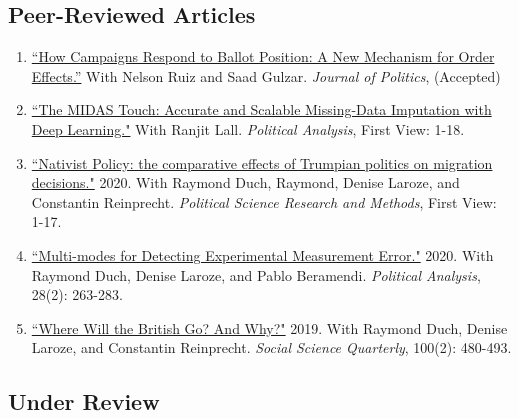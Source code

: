 \documentclass[11pt, a4paper]{article}
\begin{document}
 \subsection*{Peer-Reviewed Articles}

 \begin{enumerate}

 \item \href{https://ts-robinson.com/publication/gulzar-how-campaigns-respond-2020/gulzar-how-campaigns-respond-2020.pdf}{``How Campaigns Respond to Ballot Position: A New Mechanism for Order Effects.''} With Nelson Ruiz and Saad Gulzar. \textit{Journal of Politics}, (Accepted)

 \item \href{https://doi.org/10.1017/pan.2020.49}{``The MIDAS Touch: Accurate and Scalable Missing-Data Imputation with Deep Learning."} With Ranjit Lall. \textit{Political Analysis}, First View: 1-18.

 \item \href{https://doi.org/10.1017/psrm.2020.33}{``Nativist Policy: the comparative effects of Trumpian politics on migration decisions."} 2020. With Raymond Duch, Raymond, Denise Laroze, and Constantin Reinprecht. \textit{Political Science Research and Methods}, First View: 1-17.

 \item \href{https://www.cambridge.org/core/journals/political-analysis/article/multimodes-for-detecting-experimental-measurement-error/37514FC46CF29C7B345DB9881E252150/share/7b059037b0da9182a33316d7f87b2de81b619592}{``Multi-modes for Detecting Experimental Measurement Error."} 2020. With Raymond Duch, Denise Laroze, and Pablo Beramendi. \textit{Political Analysis}, 28(2): 263-283.

 \item \href{https://doi.org/10.1111/ssqu.12584}{``Where Will the British Go? And Why?"} 2019. With Raymond Duch, Denise Laroze, and Constantin Reinprecht. \textit{Social Science Quarterly}, 100(2): 480-493. 

\end{enumerate}


\subsection*{Under Review}
\end{document}
